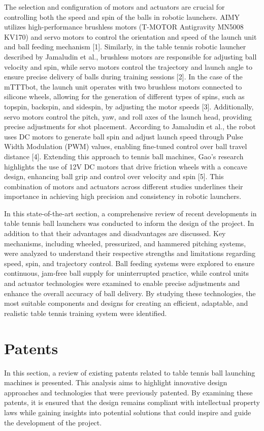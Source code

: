 \documentclass[12pt]{article}
\begin{document}
The selection and configuration of motors and actuators are crucial for controlling both the speed and spin of the balls in robotic launchers. AIMY utilizes high-performance brushless motors (T-MOTOR Antigravity MN5008 KV170) and servo motors to control the orientation and speed of the launch unit and ball feeding mechanism [1]. Similarly, in the table tennis robotic launcher described by Jamaludin et al., brushless motors are responsible for adjusting ball velocity and spin, while servo motors control the trajectory and launch angle to ensure precise delivery of balls during training sessions [2]. In the case of the mTTTbot, the launch unit operates with two brushless motors connected to silicone wheels, allowing for the generation of different types of spins, such as topspin, backspin, and sidespin, by adjusting the motor speeds [3]. Additionally, servo motors control the pitch, yaw, and roll axes of the launch head, providing precise adjustments for shot placement. According to Jamaludin et al., the robot uses DC motors to generate ball spin and adjust launch speed through Pulse Width Modulation (PWM) values, enabling fine-tuned control over ball travel distance [4]. Extending this approach to tennis ball machines, Gao’s research highlights the use of 12V DC motors that drive friction wheels with a concave design, enhancing ball grip and control over velocity and spin [5]. This combination of motors and actuators across different studies underlines their importance in achieving high precision and consistency in robotic launchers.



\vspace{1cm}In this state-of-the-art section, a comprehensive review of recent developments in table tennis ball launchers was conducted to inform the design of the project. In addition to that their advantages and disadvantages are discussed. Key mechanisms, including wheeled, pressurized, and hammered pitching systems, were analyzed to understand their respective strengths and limitations regarding speed, spin, and trajectory control. Ball feeding systems were explored to ensure continuous, jam-free ball supply for uninterrupted practice, while control units and actuator technologies were examined to enable precise adjustments and enhance the overall accuracy of ball delivery.  By studying these technologies, the most suitable components and designs for creating an efficient, adaptable, and realistic table tennis training system were identified. 

 
\section{Patents}
In this section, a review of existing patents related to table tennis ball launching machines is presented. This analysis aims to highlight innovative design approaches and technologies that were previously patented. By examining these patents, it is ensured that the design remains compliant with intellectual property laws while gaining insights into potential solutions that could inspire and guide the development of the project.
\end{document}
